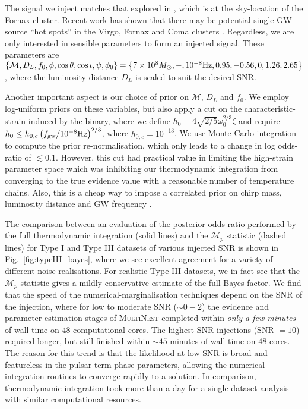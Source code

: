 \documentclass[prd,twocolumn,showpacs,nofootinbib]{revtex4}
\begin{document}

The signal we inject matches that explored in \citet{ellisbayesian2013}, which is at the sky-location of the Fornax cluster. Recent work has shown that there may be potential single GW source ``hot spots'' in the Virgo, Fornax and Coma clusters \citep{fornax-hotspot}. Regardless, we are only interested in sensible parameters to form an injected signal. These parameters are $\left\{\mathcal{M},D_L,f_0,\phi,\cos\theta,\cos\iota,\psi,\phi_0\right\} = \left\{7\times10^8M_{\odot},-,10^{-8}{\rm Hz},0.95,-0.56,0,1.26,2.65\right\}$, where the luminosity distance $D_L$ is scaled to suit the desired SNR. 

Another important aspect is our choice of prior on $\mathcal{M}$, $D_L$ and $f_0$. We employ log-uniform priors on these variables, but also apply a cut on the characteristic-strain induced by the binary, where we define $h_0 = 4\sqrt{2/5}\omega_0^{2/3}\zeta$ and require $h_0 \leq h_{0,c}\left(f_{\rm gw} / 10^{-8}{\rm Hz}\right)^{2/3}$, where $h_{0,c}=10^{-13}$. We use Monte Carlo integration to compute the prior re-normalisation, which only leads to a change in log odds-ratio of $\lesssim 0.1$. However, this cut had practical value in limiting the high-strain parameter space which was inhibiting our thermodynamic integration from converging to the true evidence value with a reasonable number of temperature chains. Also, this is a cheap way to impose a correlated prior on chirp mass, luminosity distance and GW frequency \citep{nanogravCW_2014}.  

The comparison between an evaluation of the posterior odds ratio performed by the full thermodynamic integration (solid lines) and the {\bf $\mathcal{M}_p$} statistic (dashed lines) for Type I and Type III datasets of various injected SNR is shown in Fig.\ \ref{fig:typeIII_bayes}, where we see excellent agreement for a variety of different noise realisations. For realistic Type III datasets, we in fact see that the {\bf $\mathcal{M}_p$} statistic gives a mildly conservative estimate of the full Bayes factor. We find that the speed of the numerical-marginalisation techniques depend on the SNR of the injection, where for low to moderate SNR ($\sim 0 - 2$) the evidence and parameter-estimation stages of \textsc{MultiNest} completed within {\it only a few minutes} of wall-time on $48$ computational cores. The highest SNR injections (SNR $=10$) required longer, but still finished within $\sim 45$ minutes of wall-time on $48$ cores. The reason for this trend is that the likelihood at low SNR is broad and featureless in the pulsar-term phase parameters, allowing the numerical integration routines to converge rapidly to a solution. In comparison, thermodynamic integration took more than a day for a single dataset analysis with similar computational resources. 
\end{document}
